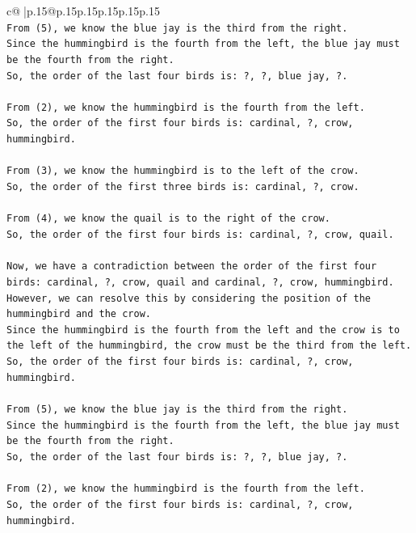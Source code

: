 \documentclass{article}
\begin{document}
{\begin{supertabular}{c@{$\;$}|p{.15\linewidth}@{}p{.15\linewidth}p{.15\linewidth}p{.15\linewidth}p{.15\linewidth}p{.15\linewidth}}
{{{\\ 
\texttt{From (5), we know the blue jay is the third from the right. } \\
\texttt{Since the hummingbird is the fourth from the left, the blue jay must be the fourth from the right. } \\
\texttt{So, the order of the last four birds is: ?, ?, blue jay, ?.} \\
\\ 
\texttt{From (2), we know the hummingbird is the fourth from the left. } \\
\texttt{So, the order of the first four birds is: cardinal, ?, crow, hummingbird.} \\
\\ 
\texttt{From (3), we know the hummingbird is to the left of the crow. } \\
\texttt{So, the order of the first three birds is: cardinal, ?, crow.} \\
\\ 
\texttt{From (4), we know the quail is to the right of the crow. } \\
\texttt{So, the order of the first four birds is: cardinal, ?, crow, quail.} \\
\\ 
\texttt{Now, we have a contradiction between the order of the first four birds: cardinal, ?, crow, quail and cardinal, ?, crow, hummingbird. } \\
\texttt{However, we can resolve this by considering the position of the hummingbird and the crow. } \\
\texttt{Since the hummingbird is the fourth from the left and the crow is to the left of the hummingbird, the crow must be the third from the left. } \\
\texttt{So, the order of the first four birds is: cardinal, ?, crow, hummingbird.} \\
\\ 
\texttt{From (5), we know the blue jay is the third from the right. } \\
\texttt{Since the hummingbird is the fourth from the left, the blue jay must be the fourth from the right. } \\
\texttt{So, the order of the last four birds is: ?, ?, blue jay, ?.} \\
\\ 
\texttt{From (2), we know the hummingbird is the fourth from the left. } \\
\texttt{So, the order of the first four birds is: cardinal, ?, crow, hummingbird.} \\
}}}
\end{supertabular}}
\end{document}
